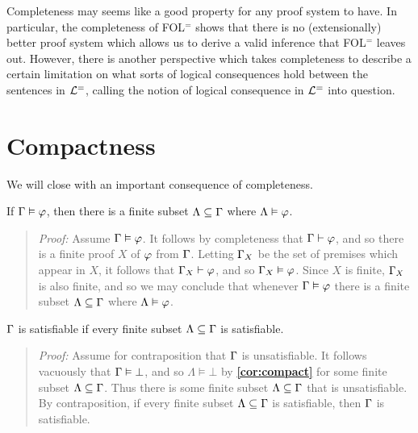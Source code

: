 Completeness may seems like a good property for any proof system to have.
In particular, the completeness of FOL$^=$ shows that there is no (extensionally) better proof system which allows us to derive a valid inference that FOL$^=$ leaves out.
However, there is another perspective which takes completeness to describe a certain limitation on what sorts of logical consequences hold between the sentences in $\mathcal{L}^{=}$, calling the notion of logical consequence in $\mathcal{L}^{=}$ into question.






\section{Compactness}%
  \label{sec:Compactness}
  

We will close with an important consequence of completeness.

\begin{Cthm} \label{cor:compact}
  If $\Gamma\vDash\varphi$, then there is a finite subset $\Lambda\subseteq\Gamma$ where $\Lambda\vDash\varphi$.
\end{Cthm}

\begin{quote} 
  \textit{Proof:} 
Assume $\Gamma\vDash\varphi$.  
It follows by completeness that $\Gamma\vdash\varphi$, and so there is a finite proof $X$ of $\varphi$ from $\Gamma$.
Letting $\Gamma_X$ be the set of premises which appear in $X$, it follows that $\Gamma_X\vdash\varphi$, and so $\Gamma_X\vDash\varphi$.
Since $X$ is finite, $\Gamma_X$ is also finite, and so we may conclude that whenever $\Gamma\vDash\varphi$ there is a finite subset $\Lambda\subseteq\Gamma$ where $\Lambda\vDash\varphi$.
\end{quote}



\begin{Cthm}[Compactness] \label{cor:compact2}
  $\Gamma$ is satisfiable if every finite subset $\Lambda\subseteq\Gamma$ is satisfiable.
\end{Cthm}

\begin{quote} 
  \textit{Proof:} 
  Assume for contraposition that $\Gamma$ is unsatisfiable. 
  It follows vacuously that $\Gamma\vDash\bot$, and so $\Lambda\models\bot$ by \textbf{\ref{cor:compact}} for some finite subset $\Lambda\subseteq\Gamma$.
  Thus there is some finite subset $\Lambda\subseteq\Gamma$ that is unsatisfiable. 
  By contraposition, if every finite subset $\Lambda\subseteq\Gamma$ is satisfiable, then $\Gamma$ is satisfiable. 
\end{quote}


